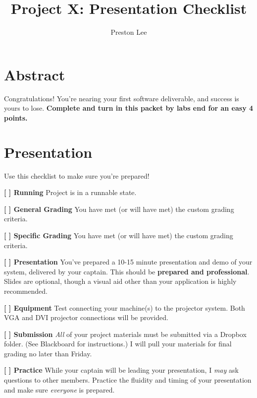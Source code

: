 \documentclass[10pt]{article}
\title{Project X: Presentation Checklist}
\author{Preston Lee}
\date{}                                           %
\begin{document}
\maketitle

\section{Abstract}
Congratulations! You're nearing your first software deliverable, and success is yours to lose. {\bf Complete and turn in this packet by labs end for an easy 4 points.}

\vspace{.5cm}

\hspace{.5in}{\bf Team Captain: }

\hspace{.5in}{\bf Team Code Name: }

\hspace{.5in}{\bf Project Code Name: }


\section{Presentation}
Use this checklist to make sure you're prepared!
\begin{description}
\item {\bf [  ] Running} Project is in a runnable state.
\item {\bf [  ] General Grading} You have met (or will have met) the custom grading criteria.
\item {\bf [  ] Specific Grading} You have met (or will have met) the custom grading criteria.
\item {\bf [  ] Presentation} You've prepared a 10-15 minute presentation and demo of your system, delivered by your captain. This should be {\bf prepared and professional}. Slides are optional, though a visual aid other than your application is highly recommended.
\item {\bf [  ] Equipment} Test connecting your machine(s) to the projector system. Both VGA and DVI projector connections will be provided.
\item {\bf [  ] Submission} {\it All} of your project materials must be submitted via a Dropbox folder. (See Blackboard for instructions.) I will pull your materials for final grading no later than Friday.
\item {\bf [  ] Practice} While your captain will be leading your presentation, I {\it may} ask questions to other members. Practice the fluidity and timing of your presentation and make sure {\it everyone} is prepared.
\end{description}
\end{document}
